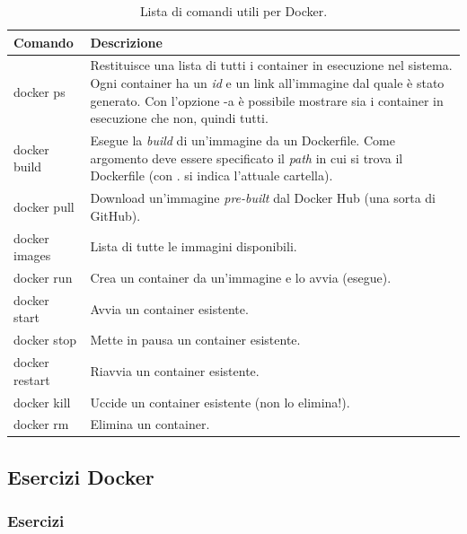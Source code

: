 \documentclass[a4paper]{article}
\begin{document}
	\begin{table}[!htpb]
		\centering
		\begin{tabular}{@{} l | p{25em} @{}}
			\toprule
			\textbf{Comando} & \textbf{Descrizione} \\
			\midrule
			\textsf{docker ps}		& Restituisce una lista di tutti i container in esecuzione nel sistema. Ogni container ha un \emph{id} e un link all'immagine dal quale è stato generato. Con l'opzione \textsf{-a} è possibile mostrare sia i container in esecuzione che non, quindi tutti. \\[1em]
			\textsf{docker build}	& Esegue la \emph{build} di un'immagine da un Dockerfile. Come argomento deve essere specificato il \emph{path} in cui si trova il Dockerfile (con . si indica l'attuale cartella). \\[1em]
			\textsf{docker pull}	& Download un'immagine \emph{pre-built} dal Docker Hub (una sorta di GitHub). \\[1em]
			\textsf{docker images}	& Lista di tutte le immagini disponibili. \\[1em]
			\textsf{docker run}		& Crea un container da un'immagine e lo avvia (esegue). \\[1em]
			\textsf{docker start}	& Avvia un container esistente. \\[1em]
			\textsf{docker stop} 	& Mette in pausa un container esistente. \\[1em]
			\textsf{docker restart} & Riavvia un container esistente. \\[1em]
			\textsf{docker kill} 	& Uccide un container esistente (non lo elimina!). \\[1em]
			\textsf{docker rm}		& Elimina un container. \\
			\bottomrule
		\end{tabular}
		\caption{Lista di comandi utili per Docker.}
	\end{table}\newpage
	
	\subsection[\textcolor{Red3}{\textbf{Esercizi}} Docker]{Esercizi Docker}
	
	\subsubsection{Esercizi}
	
\end{document}
